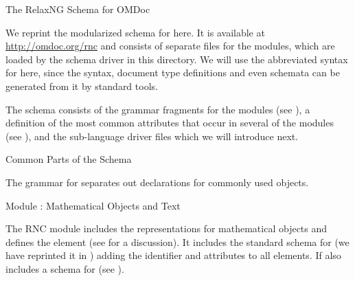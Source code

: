 
\begin{tchapter}[id=rnc]{The RelaxNG Schema for OMDoc}

We reprint the modularized {\relaxng} schema for {\omdoc} here. It is available at
\url{http://omdoc.org/rnc} and consists of separate files for the {\omdoc}
modules, which are loaded by the schema driver {} in this directory. We
will use the abbreviated syntax for {\relaxng} here, since the {\xml} syntax, document
type definitions and even {\xml} schemata can be generated
from it by standard tools.

The {\relaxng} schema consists of the grammar fragments for the modules (see
{}), a definition of the most common attributes that
occur in several of the modules (see {}), and the sub-language
driver files which we will introduce next.

\begin{tsection}[id=rnc:attributes]{Common Parts of the Schema}
  
  The {\relaxng} grammar for {\omdoc} separates out declarations for commonly used
  objects.


  
\end{tsection}

\begin{tsection}[id=rnc:math]{Module {}: Mathematical Objects and Text}
  
  The RNC module {} includes the representations for mathematical objects
  and defines the {} element (see {} for a discussion). It
  includes the standard {\relaxng} schema for {\openmath} (we have reprinted it in
  {}) adding the {\omdoc} identifier and {\css}
  attributes to all elements. If also includes a schema for {\mathml}
  (see {}).


\end{tsection}


\end{tchapter}
